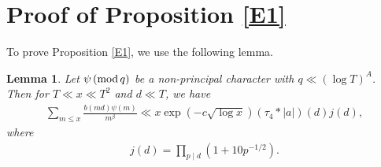 \documentclass[oneside, 12pt]{amsart}
\newtheorem{lem}[prop]{Lemma}
\theoremstyle{definition}
\renewcommand{\pmod}[1]{\,(\textup{mod}\,#1)}
\begin{document}
\section{Proof of Proposition \ref{E1}}\label{SmallmoduliProof}
To prove Proposition \ref{E1}, we use the following lemma.
\begin{lem}\label{NontirivalCharacter}
	Let $\psi \pmod q$ be a non-principal character with $q\ll (\log T)^A $. Then for $T\ll x\ll T^2$ and $d\ll T$, we have
	\begin{align*}
	\sum_{m\leq x} \frac{b(md)\psi(m)}{m^\beta}\ll x\exp (-c\sqrt{\log x}) (\tau_4*|a|)(d)j(d),
	\end{align*}
	where 
	\begin{align}
	j(d)=\prod_{p\mid d} (1+10p^{-1/2}).
	\end{align}
\end{lem}
\end{document}
